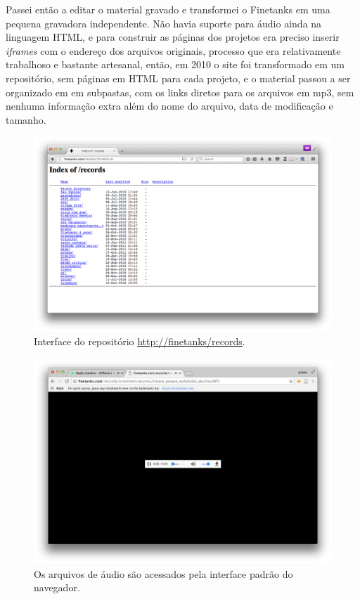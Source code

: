 Passei então a editar o material gravado e transformei o Finetanks em uma pequena gravadora independente. Não havia suporte para áudio ainda na linguagem HTML, e para construir as páginas dos projetos era preciso inserir \emph{iframes} com o endereço dos arquivos originais, processo que era relativamente trabalhoso e bastante artesanal, então, em 2010 o site foi transformado em um repositório, sem páginas em HTML para cada projeto, e o material passou a ser organizado em em subpastas, com os links diretos para os arquivos em mp3, sem nenhuma informação extra além do nome do arquivo, data de modificação e tamanho. 


\begin{figure}

\includegraphics[width=1\textwidth]{pictures/cap1/finetanksrecords}
\caption{Interface do repositório \url{http://finetanks/records}.}
\label{fig:finetanksrecords}
\end{figure}


\begin{figure}

\includegraphics[width=1\textwidth]{pictures/cap1/finetanksmp3}
\caption{Os arquivos de áudio são acessados pela interface padrão do navegador.}
\label{fig:finetanksmp3}
\end{figure}


